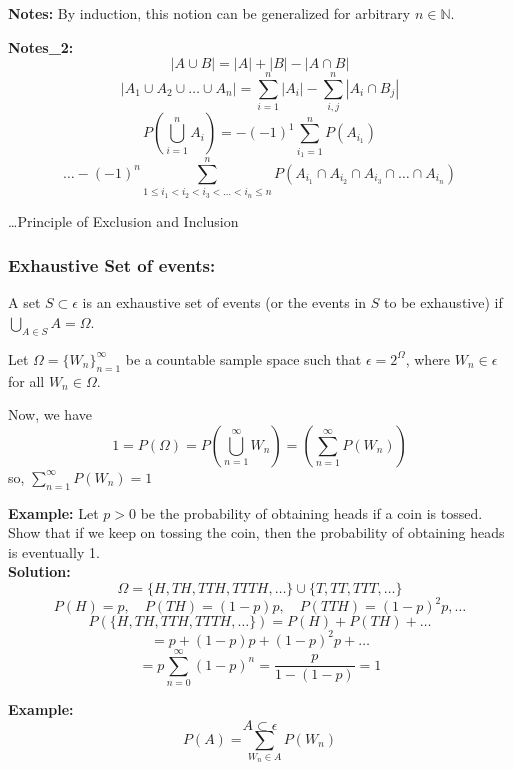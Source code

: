 \documentclass{article}
\theoremstyle{definition}
\begin{document}
    \begin{mdframed}[style =MyFrame]
         \textbf{Notes:} By induction, this notion can be generalized for arbitrary $n \in \mathbb{N}$.
         
    \textbf{Notes\_2:} 
    \begin{equation}
        |A \cup B| = |A| + |B| - |A \cap B|
    \end{equation}
    \begin{equation}
        | A_1 \cup A_2 \cup \dots \cup A_n| = \sum_{i=1}^{n}|A_i| - \sum_{i,j}^{n}|A_i \cap B_j|
    \end{equation}
    \[ P\left( \bigcup_{i=1}^{n}A_i\right) = -(-1)^1\sum_{i{_1}=1}^{n}P(A_{i_1}) \]
    \[ \ldots-(-1)^n \sum_{1\leq i_{1}<i_{2}<i_{3}<\ldots <i_{n}\leq n}^{n}P(A_{i_1}\cap A_{i_2}\cap A_{i_3}\cap \ldots \cap A_{i_n}) \]

    \dots Principle of Exclusion and Inclusion
         
    \end{mdframed}
   

 \subsubsection{Exhaustive Set of events:} A set $S \subset \epsilon$ is an exhaustive set of events (or the events in $S$ to be exhaustive) if $\bigcup_{A \in S} A = \Omega$.

    Let $\Omega = \{W_n\}_{n=1}^{\infty}$ be a countable sample space such that $\epsilon = 2^{\Omega}$,
    where $W_n \in \epsilon$ for all $W_n \in \Omega$.

    Now, we have
    \[ 1 = P(\Omega) = P\left(\bigcup_{n=1}^{\infty} W_{n}\right) = \left(\sum_{n=1}^{\infty} P(W_{n})\right) \]
    so, $\sum_{n=1}^{\infty} P(W_n) = 1$

    \textbf{Example:}
    Let $p > 0$ be the probability of obtaining heads if a coin is tossed. Show that if we keep on tossing the coin, then the probability of obtaining heads is eventually 1.\\
    \textbf{Solution:}
    \[ \Omega = \{H, TH, TTH, TTTH, \dots\} \cup \{T, TT, TTT, \dots\} \]
    \[ P(H) = p, \quad P(TH) = (1-p)p, \quad P(TTH) = (1-p)^2p, \dots \]
    \[ P(\{H, TH, TTH, TTTH, \dots\}) = P(H) + P(TH) + \dots \]
    \[ = p + (1-p)p + (1-p)^2p + \dots \]
    \[ = p \sum_{n=0}^{\infty} (1-p)^n = \frac{p}{1-(1-p)} = 1 \]

\textbf{Example:}
\[ A \subset \epsilon \]
\[ P(A) = \sum_{W_n \in A} P(W_n) \]
\end{document}
